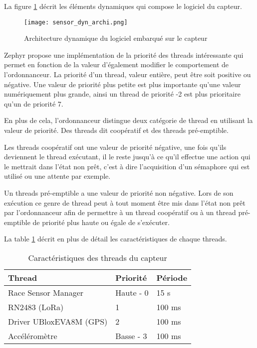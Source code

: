 La figure \ref{fig:sensor_dyn_archi} décrit les éléments dynamiques qui compose le logiciel du capteur.


\begin{figure}[htb]
\centering 
\texttt{[image: sensor\_dyn\_archi.png]} 
\caption{Architecture dynamique du logiciel embarqué sur le capteur}
\label{fig:sensor_dyn_archi}
\end{figure}

Zephyr propose une implémentation de la priorité des threads intéressante qui permet en fonction de la valeur d'également modifier le comportement de l'ordonnanceur. La priorité d'un thread, valeur entière, peut être soit positive ou négative. Une valeur de priorité plus petite est plus importante qu'une valeur numériquement plus grande, ainsi un thread de priorité -2 est plus prioritaire qu'un de priorité 7.

En plus de cela, l'ordonnanceur distingue deux catégorie de thread en utilisant la valeur de priorité. Des threads dit coopératif et des threads pré-emptible.

Les threads coopératif ont une valeur de priorité négative, une fois qu'ils deviennent le thread exécutant, il le reste jusqu'à ce qu'il effectue une action qui le mettrait dans l'état non prêt, c'est à dire l'acquisition d'un sémaphore qui est utilisé ou une attente par exemple.

Un threads pré-emptible a une valeur de priorité non négative. Lors de son exécution ce genre de thread peut à tout moment être mis dans l'état non prêt par l'ordonnanceur afin de permettre à un thread coopératif ou à un thread pré-emptible de priorité plus haute ou égale de s'exécuter. \cite{zephyr_web}

La table \ref{tab:threads_cara} décrit en plus de détail les caractéristiques de chaque threads.

\begin{table}[htb]
\caption{Caractéristiques des threads du capteur}
\label{tab:threads_cara}
\centering
\begin{tabular}{ l l l }
\toprule
Thread & Priorité & Période \\
\midrule
Race Sensor Manager & Haute - 0 & 15 s  \\
RN2483 (LoRa) & 1 & 100 ms  \\
Driver UBloxEVA8M (GPS) & 2 & 100 ms  \\
Accéléromètre & Basse - 3 & 100 ms  \\
\bottomrule 
\end{tabular}
\end{table}

